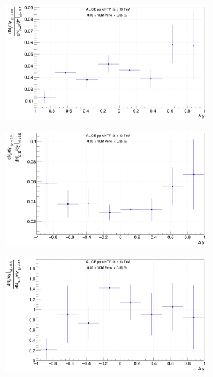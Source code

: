 \begin{figure}[h]
	\centering
	\begin{subfigure}[b]{.45\linewidth}
         \centering
         \includegraphics[width=1.\textwidth, angle=0, clip=true, trim=0cm 0 0 0]{Figures/Sec06_Results/EfficiencyCorrectedYield.png} 
         \caption{ }
         \label{fig:YieldEffCorr}
    \end{subfigure}
    \hfill
    \begin{subfigure}[b]{.45\linewidth}
         \centering
         \includegraphics[width=1.\textwidth, angle=0, clip=true, trim=0cm 0 0 0cm]{Figures/Sec06_Results/WrongCorrectedYield.png}
         \caption{ }
         \label{fig:YieldWrongPairEffCorr} 
    \end{subfigure}
    \hfill
    \begin{subfigure}[b]{.45\linewidth}
         \centering
         \includegraphics[width=1.\textwidth, angle=0, clip=true, trim=0cm 0 0 0cm]{Figures/Sec06_Results/Eff+PairCorrectedYield.png}

\end{subfigure}
\end{figure}
